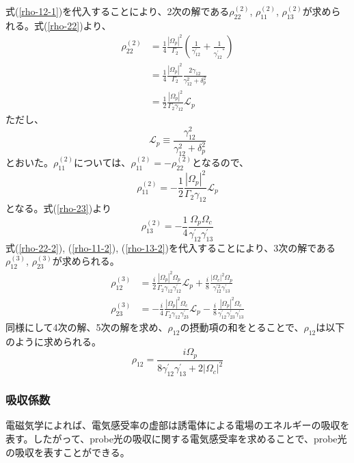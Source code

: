 \documentclass[dvipdfmx]{jsarticle}
\begin{document}
式(\ref{rho-12-1})を代入することにより、2次の解である$\rho_{22}^{(2)}$, $\rho_{11}^{(2)}$, $\rho_{13}^{(2)}$が求められる。式(\ref{rho-22})より、
\begin{equation}
\begin{split}
\label{rho-22-2}
    \rho_{22}^{(2)} &= \frac{1}{4}\frac{|\Omega_p|^2}{\Gamma_2} \left( \frac{1}{\gamma_{12}^{'}} + \frac{1}{{\gamma_{12}^{'}}^*} \right) \\
    &= \frac{1}{4}\frac{|\Omega_p|^2}{\Gamma_2} \frac{2\gamma_{12}}{\gamma_{12}^2 + \delta_{p}^2} \\
    &= \frac{1}{2}\frac{|\Omega_p|^2}{\Gamma_2 \gamma_{12}} \mathcal{L}_p
\end{split}
\end{equation}
ただし、
\begin{equation}
    \mathcal{L}_p \equiv \frac{\gamma_{12}^2}{\gamma_{12}^2 + \delta_{p}^2}
\end{equation}
とおいた。$\rho_{11}^{(2)}$については、$\rho_{11}^{(2)} = -\rho_{22}^{(2)}$となるので、
\begin{equation}
\label{rho-11-2}
\rho_{11}^{(2)} = -\frac{1}{2} \frac{|\Omega_p|^2}{\Gamma_2 \gamma_{12}} \mathcal{L}_p
\end{equation}
となる。式(\ref{rho-23})より
\begin{equation}
\label{rho-13-2}
\rho_{13}^{(2)} = -\frac{1}{4}\frac{\Omega_p \Omega_c}{\gamma_{12}^{'} \gamma_{13}^{'}} 
\end{equation}
式(\ref{rho-22-2}), (\ref{rho-11-2}), (\ref{rho-13-2})を代入することにより、3次の解である$\rho_{12}^{(3)}$, $\rho_{23}^{(3)}$が求められる。
\begin{align}
\label{rho-12-3}
\rho_{12}^{(3)} &= \frac{i}{2} \frac{|\Omega_p|^2 \Omega_p}{\Gamma_2 \gamma_{12} \gamma_{12}^{'}} \mathcal{L}_p +  \frac{i}{8} \frac{|\Omega_c|^2 \Omega_p}{\gamma_{12}^{'2} \gamma_{13}^{'}} \\
\rho_{23}^{(3)} &= -\frac{i}{4} \frac{|\Omega_p|^2 \Omega_c}{\Gamma_2 \gamma_{12} \gamma_{23}^{'}} \mathcal{L}_p -  \frac{i}{8} \frac{|\Omega_p|^2 \Omega_c}{\gamma_{12}^{'} \gamma_{23}^{'} \gamma_{13}^{'}}
\end{align}
同様にして4次の解、5次の解を求め、$\rho_{12}$の摂動項の和をとることで、$\rho_{12}$は以下のように求められる。\cite{eit-absorption}
\begin{equation}
    \rho_{12} = \frac{i\Omega_p}{8\gamma_{12}^{'}\gamma_{13}^{'} + 2|\Omega_c|^2}
\end{equation}


\subsubsection{吸収係数}
電磁気学によれば、電気感受率の虚部は誘電体による電場のエネルギーの吸収を表す。\cite{nagaoka-yosuke}したがって、probe光の吸収に関する電気感受率を求めることで、probe光の吸収を表すことができる。
\end{document}
